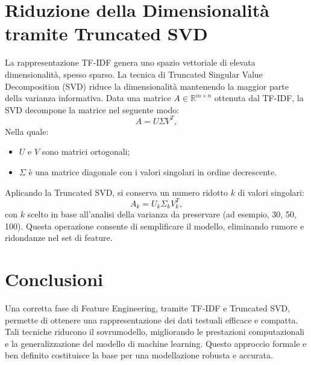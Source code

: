 \section{Riduzione della Dimensionalità tramite Truncated SVD}
La rappresentazione TF-IDF genera uno spazio vettoriale di elevata dimensionalità, spesso sparso. La tecnica di Truncated Singular Value Decomposition (SVD) riduce la dimensionalità mantenendo la maggior parte della varianza informativa. Data una matrice \(A \in \mathbb{R}^{m \times n}\) ottenuta dal TF-IDF, la SVD decompone la matrice nel seguente modo:
\[
A = U \Sigma V^T,
\]
Nella quale:
\begin{itemize}
    \item \(U\) e \(V\) sono matrici ortogonali;
    \item \(\Sigma\) è una matrice diagonale con i valori singolari in ordine decrescente.
\end{itemize}
Aplicando la Truncated SVD, si conserva un numero ridotto \(k\) di valori singolari:
\[
A_k = U_k \Sigma_k V_k^T,
\]
con \(k\) scelto in base all'analisi della varianza da preservare (ad esempio, 30, 50, 100). Questa operazione consente di semplificare il modello, eliminando rumore e ridondanze nel set di feature.

\section{Conclusioni}
Una corretta fase di Feature Engineering, tramite TF-IDF e Truncated SVD, permette di ottenere una rappresentazione dei dati testuali efficace e compatta. Tali tecniche riducono il sovrumodello, migliorando le prestazioni computazionali e la generalizzazione del modello di machine learning. Questo approccio formale e ben definito costituisce la base per una modellazione robusta e accurata.